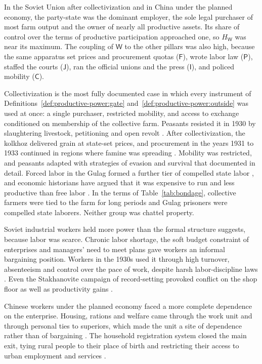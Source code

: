 \documentclass[11pt,letterpaper]{article}
\theoremstyle{definition}
\theoremstyle{remark}
\newcommand{\pF}{\mathsf{F}}
\newcommand{\pP}{\mathsf{P}}
\newcommand{\pJ}{\mathsf{J}}
\newcommand{\pI}{\mathsf{I}}
\newcommand{\pC}{\mathsf{C}}
\newcommand{\pW}{\mathsf{W}}
\newcommand{\HW}{H_{\pW}}
\begin{document}
In the Soviet Union after collectivization and in China under the planned economy, the party-state was the dominant employer, the sole legal purchaser of most farm output and the owner of nearly all productive assets. Its share of control over the terms of productive participation approached one, so $\HW$ was near its maximum. The coupling of $\pW$ to the other pillars was also high, because the same apparatus set prices and procurement quotas ($\pF$), wrote labor law ($\pP$), staffed the courts ($\pJ$), ran the official unions and the press ($\pI$), and policed mobility ($\pC$).

Collectivization is the most fully documented case in which every instrument of Definitions~\ref{def:productive-power:gate} and~\ref{def:productive-power:outside} was used at once: a single purchaser, restricted mobility, and access to exchange conditioned on membership of the collective farm. Peasants resisted it in 1930 by slaughtering livestock, petitioning and open revolt \citep{viola1996}. After collectivization, the kolkhoz delivered grain at state-set prices, and procurement in the years 1931 to 1933 continued in regions where famine was spreading \citep{davies2004}. Mobility was restricted, and peasants adapted with strategies of evasion and survival that \citet{fitzpatrick1994} documented in detail. Forced labor in the Gulag formed a further tier of compelled state labor \citep{applebaum2003}, and economic historians have argued that it was expensive to run and less productive than free labor \citep{gregory2003}. In the terms of Table~\ref{tab:bondage}, collective farmers were tied to the farm for long periods and Gulag prisoners were compelled state laborers. Neither group was chattel property.

Soviet industrial workers held more power than the formal structure suggests, because labor was scarce. Chronic labor shortage, the soft budget constraint of enterprises \citep{kornai1986,kornai1992} and managers' need to meet plans gave workers an informal bargaining position. Workers in the 1930s used it through high turnover, absenteeism and control over the pace of work, despite harsh labor-discipline laws \citep{filtzer1986}. Even the Stakhanovite campaign of record-setting provoked conflict on the shop floor as well as productivity gains \citep{siegelbaum1988}.

Chinese workers under the planned economy faced a more complete dependence on the enterprise. Housing, rations and welfare came through the work unit and through personal ties to superiors, which made the unit a site of dependence rather than of bargaining \citep{walder1986}. The household registration system closed the main exit, tying rural people to their place of birth and restricting their access to urban employment and services \citep{cheng1994}.
\end{document}
